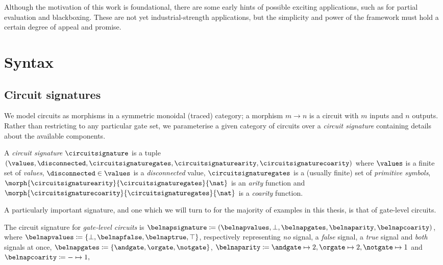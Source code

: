 \documentclass{lmcs}
\begin{document}
Although the motivation of this work is foundational, there are some early
hints of possible exciting applications, such as for partial evaluation and
blackboxing.
These are not yet industrial-strength applications, but the simplicity and
power of the framework must hold a certain degree of appeal and promise.

\section{Syntax}

\subsection{Circuit signatures}

We model circuits as morphisms in a symmetric monoidal (traced) category; a
morphism \(m \to n\) is a circuit with \(m\) inputs and \(n\) outputs.
Rather than restricting to any particular gate set, we parameterise a given
category of circuits over a \emph{circuit signature} containing details about
the available components.

\begin{defi}
    A \emph{circuit signature} \(\circuitsignature\) is a tuple \((
    \values,
    \disconnected,
    \circuitsignaturegates,
    \circuitsignaturearity,
    \circuitsignaturecoarity
    )\) where \(\values\) is a finite set of \emph{values}, \(
    \disconnected \in \values
    \) is a \emph{disconnected} value, \(\circuitsignaturegates\) is a (usually
    finite) set of \emph{primitive symbols}, \(
    \morph{\circuitsignaturearity}{\circuitsignaturegates}{\nat}
    \) is an \emph{arity} function and \(
    \morph{\circuitsignaturecoarity}{\circuitsignaturegates}{\nat}
    \) is a \emph{coarity} function.
\end{defi}

A particularly important signature, and one which we will turn to for the
majority of examples in this thesis, is that of gate-level circuits.

\begin{exa}\label{ex:belnap-signature}
    The circuit signature for \emph{gate-level circuits} is \(
    \belnapsignature \coloneqq (
    \belnapvalues,
    \bot,
    \belnapgates,
    \belnaparity,
    \belnapcoarity
    )\), where \(
    \belnapvalues \coloneqq \{\bot, \belnapfalse, \belnaptrue, \top\}
    \), respectively representing \emph{no} signal, a \emph{false} signal, a
    \emph{true} signal and \emph{both} signals at once, \(
    \belnapgates \coloneqq \{\andgate,\orgate,\notgate\}
    \), \(
    \belnaparity \coloneqq
    \andgate \mapsto 2,
    \orgate \mapsto 2,
    \notgate \mapsto 1
    \) and \(
    \belnapcoarity \coloneqq - \mapsto 1,
    \)
\end{exa}
\end{document}
